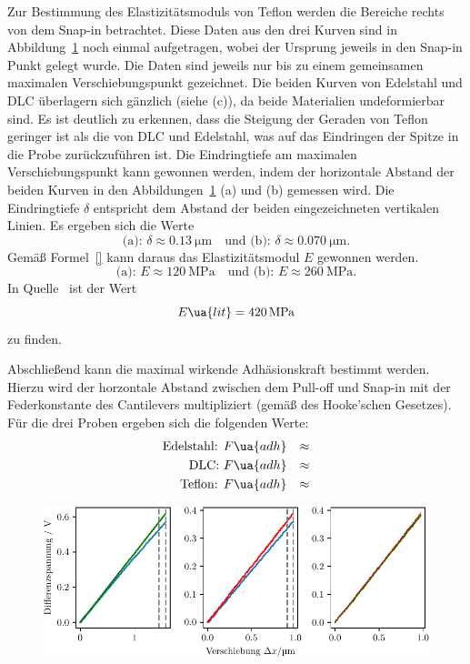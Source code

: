 Zur Bestimmung des Elastizitätsmoduls von Teflon werden die Bereiche rechts von dem Snap-in betrachtet. Diese Daten aus den drei Kurven sind
in Abbildung~\ref{fig: depth} noch einmal aufgetragen, wobei der Ursprung jeweils in den Snap-in Punkt gelegt wurde. Die Daten sind
jeweils nur bis zu einem gemeinsamen maximalen Verschiebungspunkt gezeichnet.
Die beiden Kurven von Edelstahl und DLC überlagern sich gänzlich (siehe (c)), da beide Materialien undeformierbar sind.
Es ist deutlich zu erkennen, dass
die Steigung der Geraden von Teflon geringer ist als die von DLC und Edelstahl, was auf das Eindringen der Spitze in die Probe zurückzuführen ist.
Die Eindringtiefe am maximalen Verschiebungspunkt kann gewonnen werden, indem der horizontale Abstand der beiden Kurven in den Abbildungen~\ref{fig: depth}
(a) und (b) gemessen wird. Die Eindringtiefe $\delta$ entspricht dem Abstand der beiden eingezeichneten vertikalen Linien.
Es ergeben sich die Werte
\begin{equation}
  \text{(a): } \delta \approx \SI{0.13}{\micro\meter} \quad \text{und (b): }\delta \approx \SI{0.070}{\micro\meter}.
\end{equation}
Gemäß Formel~\eqref{} kann daraus das Elastizitätsmodul $E$ gewonnen werden.
\begin{equation}
  \text{(a): } E \approx \SI{120}{\mega \pascal} \quad \text{und (b): } E \approx \SI{260}{\mega \pascal}.
\end{equation}
In Quelle~\cite{emodulteflon} ist der Wert
\begin{equation}
  E\ua{lit} = \SI{420}{\mega \pascal}
\end{equation}
zu finden.

Abschließend kann die maximal wirkende Adhäsionskraft bestimmt werden. Hierzu wird der horzontale
Abstand zwischen dem Pull-off und Snap-in mit der Federkonstante des Cantilevers multipliziert (gemäß des Hooke'schen Gesetzes).
Für die drei Proben ergeben sich die folgenden Werte:
\begin{align}
  \begin{aligned}
    \text{Edelstahl: } & F\ua{adh} &\approx \\
    \text{DLC: } & F\ua{adh}       &\approx \\
    \text{Teflon: } & F\ua{adh}    &\approx
  \end{aligned}
\end{align}

\begin{figure}
  \centering
  \includegraphics[scale = 1]{../analysis/data/force_distance/eindringtiefe.pdf}
  \caption{}
  \label{fig: depth}
\end{figure}
